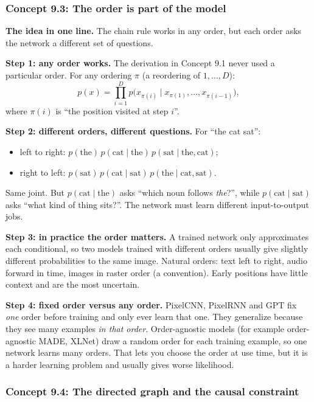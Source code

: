 \documentclass[12pt,a4paper]{article}
\begin{document}
\subsubsection{Concept 9.3: The order is part of the model}\label{c9-3}

\textbf{The idea in one line.} The chain rule works in any order, but each order asks the network a different set of questions.

\textbf{Step 1: any order works.} The derivation in Concept 9.1 never used a particular order. For any ordering $\pi$ (a reordering of $1,\dots,D$):
\[
p(x)=\prod_{i=1}^{D}p\big(x_{\pi(i)}\mid x_{\pi(1)},\dots,x_{\pi(i-1)}\big),
\]
where $\pi(i)$ is ``the position visited at step $i$''.

\textbf{Step 2: different orders, different questions.} For ``the cat sat'':
\begin{itemize}[nosep]
  \item left to right: $p(\text{the})\,p(\text{cat}\mid\text{the})\,p(\text{sat}\mid\text{the},\text{cat})$;
  \item right to left: $p(\text{sat})\,p(\text{cat}\mid\text{sat})\,p(\text{the}\mid\text{cat},\text{sat})$.
\end{itemize}
Same joint. But $p(\text{cat}\mid\text{the})$ asks ``which noun follows \emph{the}?'', while $p(\text{cat}\mid\text{sat})$ asks ``what kind of thing sits?''. The network must learn different input-to-output jobs.

\textbf{Step 3: in practice the order matters.} A trained network only approximates each conditional, so two models trained with different orders usually give slightly different probabilities to the same image. Natural orders: text left to right, audio forward in time, images in raster order (a convention). Early positions have little context and are the most uncertain.

\textbf{Step 4: fixed order versus any order.} PixelCNN, PixelRNN and GPT fix \emph{one} order before training and only ever learn that one. They generalize because they see many examples \emph{in that order}. Order-agnostic models (for example order-agnostic MADE, XLNet) draw a random order for each training example, so one network learns many orders. That lets you choose the order at use time, but it is a harder learning problem and usually gives worse likelihood.

\subsubsection{Concept 9.4: The directed graph and the causal constraint}\label{c9-4}
\end{document}
